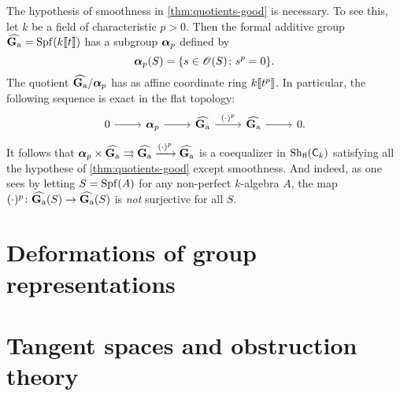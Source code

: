 \documentclass[phd,cornellheadings,draft]{cornell}
\begin{document}
\begin{example}
The hypothesis of smoothness in \ref{thm:quotients-good} is necessary. To see 
this, let $k$ be a field of characteristic $p>0$. Then the formal additive 
group $\widehat{\mathbf{G}_\mathrm{a}}=\operatorname{Spf}(k\llbracket t \rrbracket)$ has a subgroup ${\bm\alpha}_p$ defined by 
\[
  {\bm\alpha}_p(S) = \{s\in \mathscr{O}(S)\colon s^p=0\} .
\]
The quotient $\widehat{\mathbf{G}_\mathrm{a}}/{\bm\alpha}_p$ has as affine coordinate ring 
$k\llbracket t^p \rrbracket$. In particular, the following sequence is exact in the flat 
topology:
\[
\begin{tikzcd}
	0 \ar[r]
		& \balpha_p \ar[r]
		& \widehat\Ga \ar[r, "(\cdot)^p"]
		& \widehat\Ga \ar[r]
		& 0 .
\end{tikzcd}
\]
It follows that 
${\bm\alpha}_p\times \widehat{\mathbf{G}_\mathrm{a}}\rightrightarrows\widehat{\mathbf{G}_\mathrm{a}}\xrightarrow{(\cdot)^p} \widehat{\mathbf{G}_\mathrm{a}}$
is a coequalizer in $\operatorname{Sh}_{\mathrm{fl}}(\mathsf{C}_k)$ satisfying all the hypothese 
of \ref{thm:quotients-good} except smoothness. And indeed, as one sees by 
letting $S=\operatorname{Spf}(A)$ for any non-perfect $k$-algebra $A$, the map 
$(\cdot)^p\colon \widehat{\mathbf{G}_\mathrm{a}}(S)\to \widehat{\mathbf{G}_\mathrm{a}}(S)$ is \emph{not} surjective for 
all $S$. 
\end{example}





\section{Deformations of group representations}

\section{Tangent spaces and obstruction theory}






\printbibliography
\end{document}
